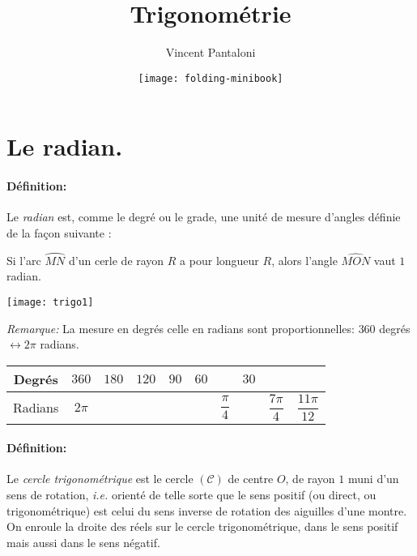\documentclass[fontsize=23pt]{scrreprt}%
\title{Trigonométrie}%
\author{\small Vincent Pantaloni}
\date{\texttt{[image: folding-minibook]}}
\begin{document}
\maketitle
\section{Le radian.}
\paragraph{Définition:}   Le \emph{radian} est, comme le degré ou le grade, une unité de mesure d'angles définie de la façon suivante :\\
\begin{minipage}{0.5\textwidth}

   Si l'arc $\wideparen{MN}$ d'un cerle de rayon $R$ a pour longueur $R$, alors l'angle $\widehat{MON}$ vaut $1$ radian. 
 
\end{minipage}\hfill
\begin{minipage}{0.48\textwidth}
\texttt{[image: trigo1]}
\end{minipage}
\bigskip

\textit{Remarque:}   La mesure en degrés celle en radians sont proportionnelles: $360$ degrés $\leftrightarrow 2\pi$ radians.

 \noindent \renewcommand{\arraystretch}{2}%
\begin{center}
\begin{tabular}{|c|*9{c|}}
         \hline 
         Degrés & $360$ &$180$& $120$ & $90$ & $60$ & \phantom{$xx$} & $30$ & &\\ 
         \hline 
         Radians & $2\pi$ &\phantom{$\sum_.^{1}$}  & \phantom{$xx$} &\phantom{$xx$}  & &$\dfrac{\pi}{4}$ & \phantom{$xx$} & $\dfrac{7\pi}{4}$& $\dfrac{11\pi}{12}$\\ 
         \hline 
      \end{tabular} 
      \end{center} 
\paragraph{Définition:} Le \emph{cercle trigonométrique} est le cercle $(\mathscr{C})$ de
        centre $O$, de rayon $1$ muni d'un sens de rotation,
        \emph{i.e.} orienté de telle sorte que le sens positif (ou direct, ou trigonométrique) est celui du sens inverse de rotation des aiguilles d'une montre.
    \newpage
On enroule la droite des réels sur le cercle trigonométrique, dans le sens positif mais aussi dans le sens négatif.
\end{document}
